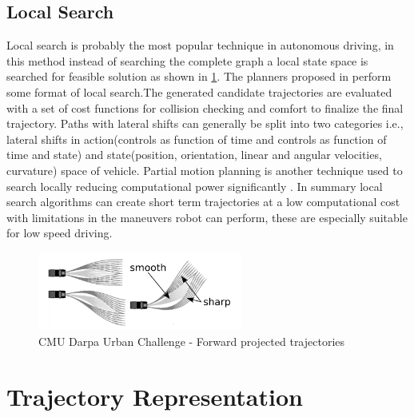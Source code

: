 \subsection{Local Search}
\label{rw_local_search}

Local search is probably the most popular technique in autonomous driving, in this method instead of searching the complete graph a local state space is searched for feasible solution as shown in \ref{cmubossduc}. The planners proposed in \cite{darpa_urban_challenge} \cite{juniorstanford} \cite{kolski_thesis} \cite{Broggi2012} \cite{real_time_traj_plan_article} \cite{urbansafetyeth} perform some format of local search.The generated candidate trajectories are evaluated with a set of cost functions for collision checking and comfort to finalize the final trajectory. Paths with lateral shifts can generally be split into two categories i.e., lateral shifts in action(controls as function of time and controls as function of time and state) and state(position, orientation, linear and angular velocities, curvature) space of vehicle\cite{howard_phd}. Partial motion planning is another technique used to search locally reducing computational power significantly \cite{partialmotionplanning}. In summary local search algorithms can create short term trajectories at a low computational cost with limitations in the maneuvers robot can perform, these are especially suitable for low speed driving.  

\begin{figure}
	\centering
	\includegraphics[width=0.6\textwidth]{Images/related_work/trajectorysetbossduc.png}
	\caption{CMU Darpa Urban Challenge - Forward projected trajectories}
	\label{cmubossduc}
\end{figure} 

\section{Trajectory Representation}
\label{trajrep}

